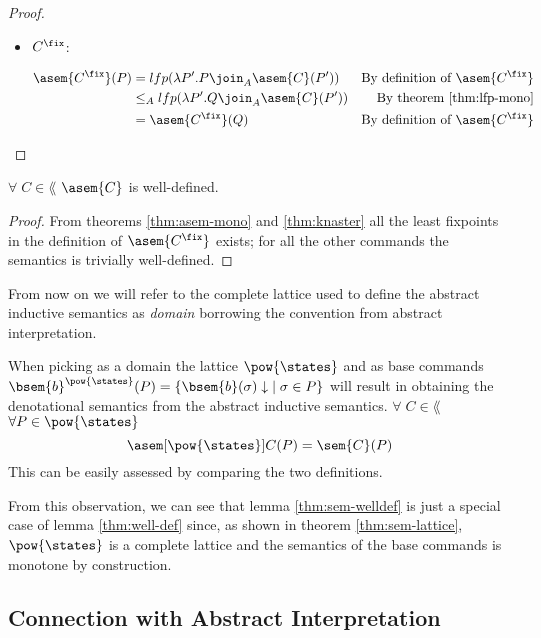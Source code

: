 \begin{proof}
\begin{itemize}
    \item $C^\fix$:

      \begin{align*}
        \asem{C^\fix}(P) 
          &= lfp(\lambda P'. P \join_A \asem{C}(P'))
          &\text{By definition of $\asem{C^\fix}$}\\
          &\leq_A lfp(\lambda P'. Q \join_A \asem{C}(P'))
          &\text{By theorem \ref{thm:lfp-mono}}\\
          &= \asem{C^\fix}(Q) 
          &\text{By definition of $\asem{C^\fix}$}\\
      \end{align*}

  \end{itemize}

\end{proof}


\begin{lemma}
  \label{thm:well-def}
  $\forall \; C \in \lang$ $\asem{C}$ is well-defined.
\end{lemma}
\begin{proof}
  From theorems \ref{thm:asem-mono} and 
  \ref{thm:knaster} all the least fixpoints in the definition of 
  $\asem{C^\fix}$ exists; for all the other commands the semantics is 
  trivially well-defined.
\end{proof}

From now on we will refer to the complete lattice used to define the abstract
inductive semantics as \textit{domain} borrowing the convention from abstract
interpretation.

\begin{observation}
  \label{obs:post}
  When picking as a domain the lattice $\pow{\states}$ and as base commands
  $\bsem{b}^{\pow{\states}}(P) = \{ \bsem{b}(\sigma)\downarrow \; \mid \sigma 
  \in P \}$ will result in obtaining the denotational semantics from the 
  abstract inductive semantics. $\forall \; C \in \lang$ $\forall P \in 
  \pow{\states}$ 
  $$\asem[\pow{\states}]{C}(P) = \sem{C}(P)$$
  This can be easily assessed by comparing the two definitions.
\end{observation}

From this observation, we can see that lemma \ref{thm:sem-welldef} is just
a special case of lemma \ref{thm:well-def} since, as shown in theorem
\ref{thm:sem-lattice}, $\pow{\states}$ is a complete lattice and the semantics
of the base commands is monotone by construction.

\subsection{Connection with Abstract Interpretation}

